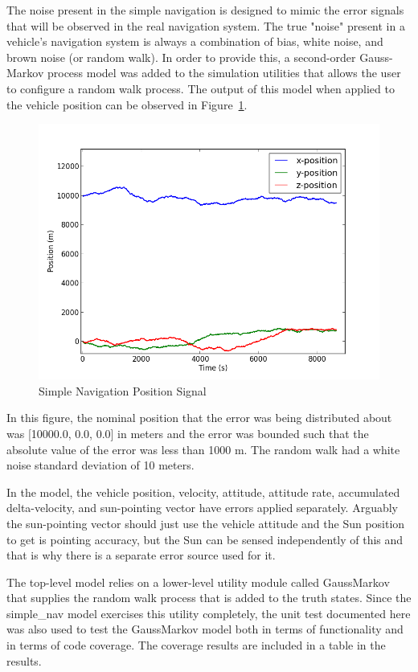 \documentclass[]{BasiliskReportMemo}
\begin{document}
The noise present in the simple navigation is designed to mimic the error signals 
that will be observed in the real navigation system.  The true "noise" present 
in a vehicle's navigation system is always a combination of bias, white noise, 
and brown noise (or random walk).  In order to provide this, a second-order 
Gauss-Markov process model was added to the simulation utilities that allows 
the user to configure a random walk process.  The output of this model when 
applied to the vehicle position can be observed in Figure~\ref{fig:pos_fig}.
\begin{figure}[htb]
        \centerline{
        \includegraphics[scale=0.5]{Figures/SimpleNavPosition}
        }
        \caption{Simple Navigation Position Signal}
        \label{fig:pos_fig}
\end{figure} 

In this figure, the nominal position that the error was being distributed about
 was [10000.0, 0.0, 0.0] in meters and the error was bounded such that the 
absolute value of the error was less than 1000 m.  The random walk had a white 
noise standard deviation of 10 meters.

In the model, the vehicle position, velocity, attitude, attitude rate, 
accumulated delta-velocity, and sun-pointing vector have errors applied 
separately.  Arguably the sun-pointing vector should just use the vehicle 
attitude and the Sun position to get is pointing accuracy, but the Sun can be 
sensed independently of this and that is why there is a separate error source
used for it.

The top-level model relies on a lower-level utility module called GaussMarkov 
that supplies the random walk process that is added to the truth states.  
Since the simple\_nav model exercises this utility completely, the unit test 
documented here was also used to test the GaussMarkov model both in terms of 
functionality and in terms of code coverage.  The coverage results are included 
in a table in the results.
\end{document}
